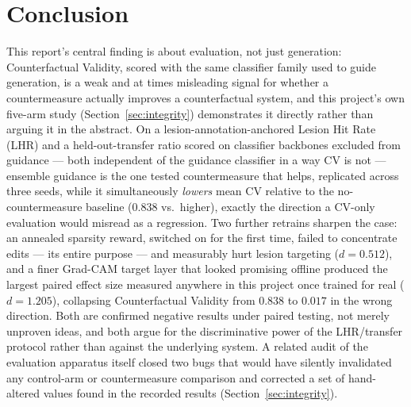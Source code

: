 \documentclass[11pt]{article}
\begin{document}
\section{Conclusion}

This report's central finding is about evaluation, not just generation:
Counterfactual Validity, scored with the same classifier family used to
guide generation, is a weak and at times misleading signal for whether a
countermeasure actually improves a counterfactual system, and this
project's own five-arm study (Section~\ref{sec:integrity}) demonstrates
it directly rather than arguing it in the abstract. On a
lesion-annotation-anchored Lesion Hit Rate (LHR) and a held-out-transfer
ratio scored on classifier backbones excluded from guidance — both
independent of the guidance classifier in a way CV is not — ensemble
guidance is the one tested countermeasure that helps, replicated across
three seeds, while it simultaneously \emph{lowers} mean CV relative to
the no-countermeasure baseline ($0.838$ vs.\ higher), exactly the
direction a CV-only evaluation would misread as a regression. Two further
retrains sharpen the case: an annealed sparsity reward, switched on for
the first time, failed to concentrate edits — its entire purpose — and
measurably hurt lesion targeting ($d=0.512$), and a finer Grad-CAM target
layer that looked promising offline produced the largest paired effect
size measured anywhere in this project once trained for real ($d=1.205$),
collapsing Counterfactual Validity from $0.838$ to $0.017$ in the wrong
direction. Both are confirmed negative results under paired testing, not
merely unproven ideas, and both argue for the discriminative power of the
LHR/transfer protocol rather than against the underlying system. A
related audit of the evaluation apparatus itself closed two bugs that
would have silently invalidated any control-arm or countermeasure
comparison and corrected a set of hand-altered values found in the
recorded results (Section~\ref{sec:integrity}).
\end{document}
